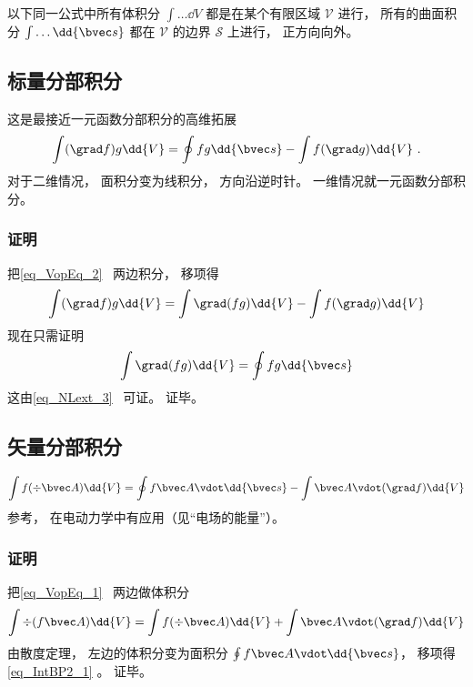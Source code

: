 

以下同一公式中所有体积分 $\int \dots \dd{V}$ 都是在某个有限区域 $\mathcal V$ 进行， 所有的曲面积分 $\int \dots \dd{\bvec s}$ 都在 $\mathcal V$ 的边界 $\mathcal S$ 上进行， 正方向向外。

\subsection{标量分部积分}
这是最接近一元函数分部积分的高维拓展
\begin{equation}\label{eq_IntBP2_2}
\int (\grad f) g \dd{V} = \oint fg \dd{\bvec s} - \int f (\grad g) \dd{V}~.
\end{equation}
对于二维情况， 面积分变为线积分， 方向沿逆时针。 一维情况就一元函数分部积分。

\subsubsection{证明}
把\autoref{eq_VopEq_2}~ 两边积分， 移项得
\begin{equation}
\int (\grad f) g \dd{V} = \int \grad (fg) \dd{V} - \int f (\grad g) \dd{V}
\end{equation}
现在只需证明
\begin{equation}
\int \grad (fg) \dd{V} = \oint fg \dd{\bvec s}
\end{equation}
这由\autoref{eq_NLext_3}~ 可证。 证毕。

\subsection{矢量分部积分}
\begin{equation}\label{eq_IntBP2_1}
\int f (\div \bvec A)\dd{V} =  \oint f \bvec A \vdot \dd{\bvec s} - \int\bvec A \vdot (\grad f)\dd{V}
\end{equation}
参考\cite{GriffE}， 在电动力学中有应用（见“电场的能量”）。

\subsubsection{证明}
把\autoref{eq_VopEq_1}~ 两边做体积分
\begin{equation}
\int\div (f \bvec A) \dd{V} = \int f (\div \bvec A)\dd{V} + \int\bvec A \vdot (\grad f)\dd{V}
\end{equation}
由散度定理， 左边的体积分变为面积分 $\oint f \bvec A \vdot \dd{\bvec s}$， 移项得\autoref{eq_IntBP2_1} 。 证毕。
